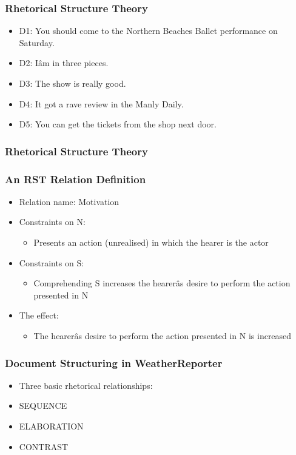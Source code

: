 \documentclass[compress,color=usenames]{beamer}
\begin{document}
\begin{frame}
\frametitle{Rhetorical Structure Theory}

\label{f154}
\begin{itemize}
\item { {D1: You should come to the Northern Beaches Ballet performance on Saturday.}}
\item { {D2: I\^am in three pieces.}}
\item { {D3: The show is really good.}}
\item { {D4: It got a rave review in the Manly Daily. }}
\item { {D5: You can get the tickets from the shop next door.}}
\end{itemize}
 
\end{frame}

\begin{frame}
\frametitle{Rhetorical Structure Theory}

\label{f156}
 
\end{frame}

\begin{frame}
\frametitle{An RST Relation Definition}

\label{f158}
\begin{itemize}
\item { {Relation name: Motivation}}
\item { {Constraints on N:}}
\begin{itemize}
\item Presents an action (unrealised) in which the hearer is the actor
\end{itemize}
\item { {Constraints on S:}}
\begin{itemize}
\item Comprehending S increases the hearer\^as desire to perform the action presented in N
\end{itemize}
\item { {The effect:}}
\begin{itemize}
\item The hearer\^as desire to perform the action presented in N is increased
\end{itemize}
\end{itemize}
 
\end{frame}

\begin{frame}
\frametitle{Document Structuring in WeatherReporter}

\label{f160}
\begin{itemize}
\item { {Three basic rhetorical relationships:}}
\item { {SEQUENCE}}
\item { {ELABORATION}}
\item { {CONTRAST}}
\end{itemize}
 
\end{frame}
\end{document}
